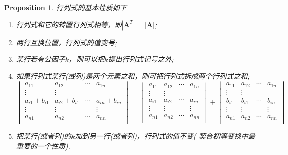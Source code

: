 \documentclass{article}
\newtheorem{proposition}[theorem]{Proposition}
\begin{document}
\begin{proposition}
\rm 行列式的基本性质如下
\begin{enumerate}
	\item 行列式和它的转置行列式相等，即$|\mathbf{A}^T| = |\mathbf{A}|$;
	\item 两行互换位置，行列式的值变号;
	\item 某行若有公因子$k$，则可以把$k$提出行列式记号之外;
	\item 如果行列式某行(或列)是两个元素之和，则可把行列式拆成两个行列式之和;
	$$
	\begin{vmatrix}
a_{11} & a_{12} & \cdots & a_{1n} \\
\vdots & \vdots & 		& \\
a_{i1}+b_{i1} & a_{i2}+b_{i1} & \cdots & a_{in}+b_{in} \\
\vdots & \vdots & 		 & \vdots \\
a_{n1} & a_{n2} & \cdots & a_{nn} \\
\end{vmatrix}
	 = \begin{vmatrix}
a_{11} & a_{12} & \cdots & a_{1n} \\
\vdots & \vdots & 		& \\
a_{i1} & a_{i2} & \cdots & a_{in} \\
\vdots & \vdots & 		 & \vdots \\
a_{n1} & a_{n2} & \cdots & a_{nn} \\
\end{vmatrix} +
	 \begin{vmatrix}
a_{11} & a_{12} & \cdots & a_{1n} \\
\vdots & \vdots & 		& \\
b_{i1} & b_{i1} & \cdots & b_{in} \\
\vdots & \vdots & 		 & \vdots \\
a_{n1} & a_{n2} & \cdots & a_{nn} \\
\end{vmatrix}
	$$
	\item 把某行(或者列)的$k$加到另一行(或者列)，行列式的值不变({\color{red} 契合初等变换中最重要的一个性质}).
\end{enumerate}
\end{proposition}
\end{document}
